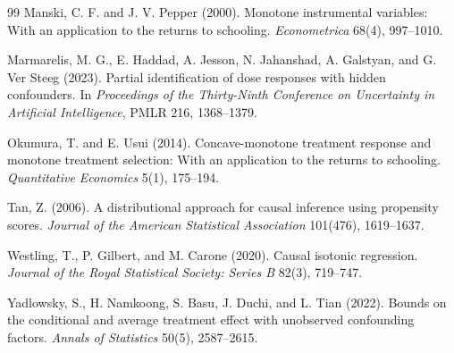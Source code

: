 \documentclass[11pt]{article}
\theoremstyle{definition}
\theoremstyle{plain}
\theoremstyle{remark}
\begin{document}
\begin{thebibliography}{99}
Manski, C. F. and J. V. Pepper (2000).
\newblock Monotone instrumental variables: With an application to the returns to schooling.
\newblock \emph{Econometrica} 68(4), 997--1010.

Marmarelis, M. G., E. Haddad, A. Jesson, N. Jahanshad, A. Galstyan, and G. Ver Steeg (2023).
\newblock Partial identification of dose responses with hidden confounders.
\newblock In \emph{Proceedings of the Thirty-Ninth Conference on Uncertainty in Artificial Intelligence}, PMLR 216, 1368--1379.

Okumura, T. and E. Usui (2014).
\newblock Concave-monotone treatment response and monotone treatment selection: With an application to the returns to schooling.
\newblock \emph{Quantitative Economics} 5(1), 175--194.

Tan, Z. (2006).
\newblock A distributional approach for causal inference using propensity scores.
\newblock \emph{Journal of the American Statistical Association} 101(476), 1619--1637.

Westling, T., P. Gilbert, and M. Carone (2020).
\newblock Causal isotonic regression.
\newblock \emph{Journal of the Royal Statistical Society: Series B} 82(3), 719--747.

Yadlowsky, S., H. Namkoong, S. Basu, J. Duchi, and L. Tian (2022).
\newblock Bounds on the conditional and average treatment effect with unobserved confounding factors.
\newblock \emph{Annals of Statistics} 50(5), 2587--2615.
\end{thebibliography}
\end{document}

